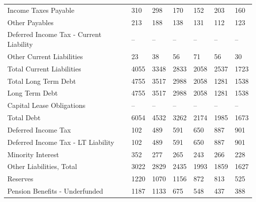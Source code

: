\documentclass[grad,numbers]{coppe}
\begin{document}
\begin{longtable}[t]{lllllll}
  \hspace{1em}\hspace{1em}Income Taxes Payable & 310 & 298 & 170 & 152 & 203 & 160\\
  \hspace{1em}\hspace{1em}Other Payables & 213 & 188 & 138 & 131 & 112 & 123\\
  \hspace{1em}\hspace{1em}Deferred Income Tax - Current Liability & -- & -- & -- & -- & -- & --\\
  \hspace{1em}\hspace{1em}Other Current Liabilities & 23 & 38 & 56 & 71 & 56 & 30\\
  \hspace{1em}Total Current Liabilities & 4055 & 3348 & 2833 & 2058 & 2537 & 1723\\
  Total \hspace{1em}\hspace{1em}Long Term Debt & 4755 & 3517 & 2988 & 2058 & 1281 & 1538\\
  Long Term Debt & 4755 & 3517 & 2988 & 2058 & 1281 & 1538\\
  \hspace{1em}\hspace{1em}Capital Lease Obligations & -- & -- & -- & -- & -- & --\\
  \hspace{1em}Total Debt & 6054 & 4532 & 3262 & 2174 & 1985 & 1673\\
  \hspace{1em}Deferred Income Tax & 102 & 489 & 591 & 650 & 887 & 901\\
  \hspace{1em}\hspace{1em}Deferred Income Tax - LT Liability & 102 & 489 & 591 & 650 & 887 & 901\\
  \hspace{1em}Minority Interest & 352 & 277 & 265 & 243 & 266 & 228\\
  \hspace{1em}Other Liabilities, Total & 3022 & 2829 & 2435 & 1993 & 1859 & 1627\\
  \hspace{1em}\hspace{1em}Reserves & 1220 & 1070 & 1156 & 872 & 813 & 525\\
  \hspace{1em}\hspace{1em}Pension Benefits - Underfunded & 1187 & 1133 & 675 & 548 & 437 & 388\\

\end{longtable}
\end{document}
